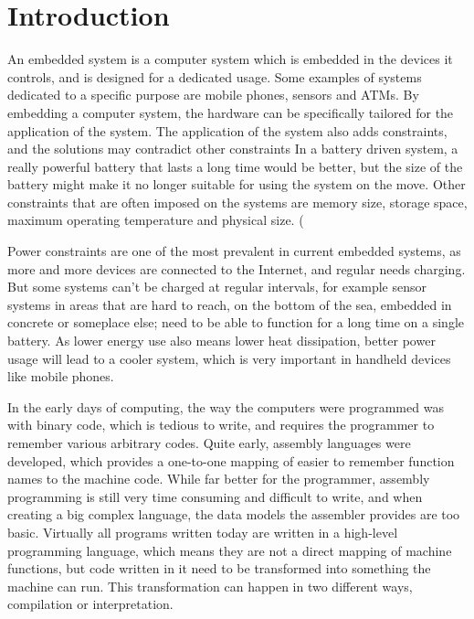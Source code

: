 \chapter{Introduction}
An embedded system is a computer system which is embedded in the devices it controls, and is designed for a dedicated usage.
Some examples of systems dedicated to a specific purpose are mobile phones, sensors and ATMs.
By embedding a computer system, the hardware can be specifically tailored for the application of the system.
The application of the system also adds constraints, and the solutions may contradict other constraints
In a battery driven system, a really powerful battery that lasts a long time would be better, but the size of the battery might make it no longer suitable for using the system on the move.
Other constraints that are often imposed on the systems are memory size, storage space, maximum operating temperature and physical size. (\cite{computercomponents} \cite{embeddsystems}

Power constraints are one of the most prevalent in current embedded systems, as more and more devices are connected to the Internet, and regular needs charging.
But some systems can’t be charged at regular intervals, for example sensor systems in areas that are hard to reach, on the bottom of the sea, embedded in concrete or someplace else; need to be able to function for a long time on a single battery.
As lower energy use also means lower heat dissipation, better power usage will lead to a cooler system, which is very important in handheld devices like mobile phones. 

In the early days of computing, the way the computers were programmed was with binary code, which is tedious to write, and requires the programmer to remember various arbitrary codes. 
Quite early, assembly languages were developed, which provides a one-to-one mapping of easier to remember function names to the machine code.
While far better for the programmer, assembly programming is still very time consuming and difficult to write, and when creating a big complex language, the data models the assembler provides are too basic. 
Virtually all programs written today are written in a high-level programming language, which means they are not a direct mapping of machine functions, but code written in it need to be transformed into something the machine can run. 
This transformation can happen in two different ways, compilation or interpretation. 

